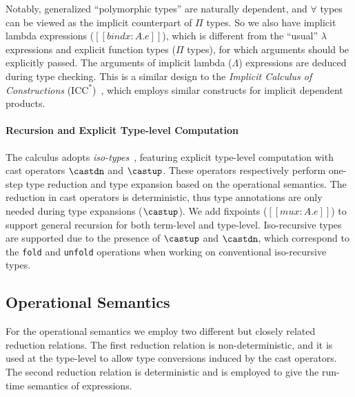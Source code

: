 Notably,
generalized ``polymorphic types'' are naturally dependent, and $\forall$
types can be viewed as the implicit counterpart of $\Pi$ types.
So we also have implicit lambda expressions ($[[bind x : A. e]]$),
which is different from the ``usual'' $\lambda$ expressions and explicit function
types ($\Pi$ types), for which arguments should be explicitly passed. The arguments
of implicit lambda ($\Lambda$) expressions are deduced during type checking.
This is a similar design to
the \emph{Implicit Calculus of Constructions} ($\text{ICC}^*$)~\citep{barras2008implicit}, which
employs similar constructs for implicit dependent products.


\paragraph{Recursion and Explicit Type-level Computation}
\label{sec:cast}
The \name calculus adopts \emph{iso-types}~\citep{isotype,yang2019pure},
featuring explicit type-level computation with cast operators
$\castdn$ and $\castup$. These operators respectively perform one-step
type reduction and type expansion based on the operational semantics.
The reduction in cast operators is deterministic, thus type
annotations are only needed during type expansions ($\castup$). We add
fixpoints ($[[mu x : A. e]]$) to support general recursion for both
term-level and type-level. Iso-recursive types are supported due to
the presence of $\castup$ and $\castdn$, which correspond to the
\verb|fold| and \verb|unfold| operations when working on conventional iso-recursive types.

\subsection{Operational Semantics}\label{subsec:semantics}

For the operational semantics we employ two different but closely related
reduction relations. The first reduction relation is non-deterministic, and
it is used at the type-level to allow type conversions induced
by the cast operators. The second reduction relation is deterministic and
is employed to give the run-time semantics of expressions.

